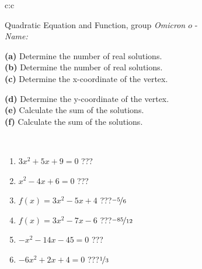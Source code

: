 \documentclass[10pt]{report}
\newcommand\omicron{o}
\begin{document}
\begin{tabular}{c:c}
\begin{minipage}[c][104.5mm][t]{0.5\linewidth}
\begin{center}
\vspace{7mm}
{\huge {\LARGE Quadratic Equation and Function}, group \textit{Omicron $\omicron$} -}\\[5mm]
\textit{Name:}\phantom{xxxxxxxxxxxxxxxxxxxxxxxxxxxxxxxxxxxxxxxxxxxxxxxxxxxxxxxxxxxxxxxxx}\\[5mm]
\begin{minipage}{0.95\linewidth}
\begin{center}
{\small \begin{minipage}{0.5\textwidth}
\textbf{(a)} Determine the number of real solutions. \\[1mm]
\textbf{(b)} Determine the number of real solutions. \\[1mm]
\textbf{(c)} Determine the x-coordinate of the vertex.
\end{minipage} \begin{minipage}{0.49\textwidth}
\textbf{(d)} Determine the y-coordinate of the vertex. \\[1mm]
\textbf{(e)} Calculate the sum of the solutions. \\[1mm]
\textbf{(f)} Calculate the sum of the solutions.
\end{minipage}
}
\end{center}
\end{minipage}
\\[4mm]
\begin{minipage}{0.79\linewidth}
\begin{center}
\begin{varwidth}{\linewidth}
\begin{enumerate}
\Large
\item $3x^2+5x+9=0$\quad \dotfill\; ???\;\dotfill {}
\item $x^2-4x+6=0$\quad \dotfill\; ???\;\dotfill {}
\item $f(x)=3x^2-5x+4$\quad \dotfill\; ???\;\dotfill \quad $\nicefrac{-5}{6}$
\item $f(x)=3x^2-7x-6$\quad \dotfill\; ???\;\dotfill \quad $\nicefrac{-85}{12}$
\item $-x^2-14x-45=0$\quad \dotfill\; ???\;\dotfill {}
\item $-6x^2+2x+4=0$\quad \dotfill\; ???\;\dotfill \quad $\nicefrac{1}{3}$
\end{enumerate}
\end{varwidth}

\end{center}
\end{minipage}
\end{center}
\end{minipage}
\end{tabular}
\end{document}

